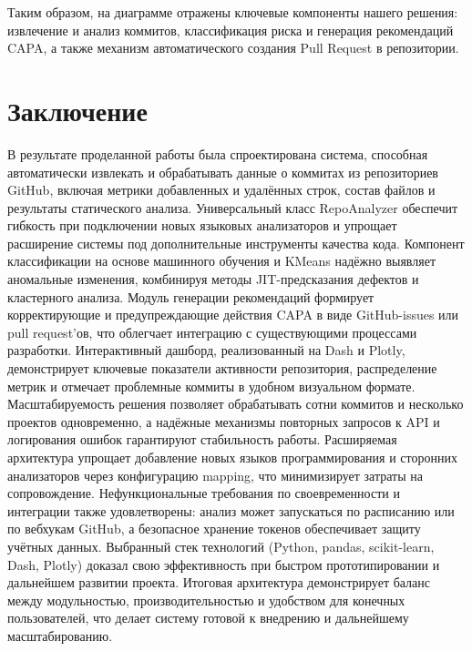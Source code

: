 Таким образом, на диаграмме отражены ключевые компоненты нашего решения: извлечение и анализ коммитов, классификация риска и генерация рекомендаций CAPA, а также механизм автоматического создания Pull Request в репозитории.

\section{Заключение} \label{ch2:conclusion}

В результате проделанной работы была спроектирована система, способная автоматически извлекать и обрабатывать данные о коммитах из репозиториев GitHub, включая метрики добавленных и удалённых строк, состав файлов и результаты статического анализа. Универсальный класс RepoAnalyzer обеспечит гибкость при подключении новых языковых анализаторов и упрощает расширение системы под дополнительные инструменты качества кода. Компонент классификации на основе машинного обучения и KMeans надёжно выявляет аномальные изменения, комбинируя методы JIT-предсказания дефектов и кластерного анализа. Модуль генерации рекомендаций формирует корректирующие и предупреждающие действия CAPA в виде GitHub-issues или pull request’ов, что облегчает интеграцию с существующими процессами разработки. Интерактивный дашборд, реализованный на Dash и Plotly, демонстрирует ключевые показатели активности репозитория, распределение метрик и отмечает проблемные коммиты в удобном визуальном формате. Масштабируемость решения позволяет обрабатывать сотни коммитов и несколько проектов одновременно, а надёжные механизмы повторных запросов к API и логирования ошибок гарантируют стабильность работы. Расширяемая архитектура упрощает добавление новых языков программирования и сторонних анализаторов через конфигурацию mapping, что минимизирует затраты на сопровождение. Нефункциональные требования по своевременности и интеграции также удовлетворены: анализ может запускаться по расписанию или по вебхукам GitHub, а безопасное хранение токенов обеспечивает защиту учётных данных. Выбранный стек технологий (Python, pandas, scikit-learn, Dash, Plotly) доказал свою эффективность при быстром прототипировании и дальнейшем развитии проекта. Итоговая архитектура демонстрирует баланс между модульностью, производительностью и удобством для конечных пользователей, что делает систему готовой к внедрению и дальнейшему масштабированию.

